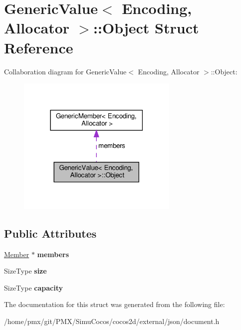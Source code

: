 \hypertarget{structGenericValue_1_1Object}{}\section{Generic\+Value$<$ Encoding, Allocator $>$\+:\+:Object Struct Reference}
\label{structGenericValue_1_1Object}


Collaboration diagram for Generic\+Value$<$ Encoding, Allocator $>$\+:\+:Object\+:
\nopagebreak
\begin{figure}[H]
\begin{center}
\leavevmode
\includegraphics[width=218pt]{structGenericValue_1_1Object__coll__graph}
\end{center}
\end{figure}
\subsection*{Public Attributes}
\begin{DoxyCompactItemize}
\item 
\mbox{\label{structGenericValue_1_1Object_ab51b8366577cb12f0280e4a6d7dab926}} 
\hyperlink{classGenericValue_a7ccf27c44058b4c11c3efc6473afb886}{Member} $\ast$ {\bfseries members}
\item 
\mbox{\label{structGenericValue_1_1Object_a10da3d9035961100ed11f955a4afd2b6}} 
Size\+Type {\bfseries size}
\item 
\mbox{\label{structGenericValue_1_1Object_ab22a81c7ac57baf0d4ea343dfd6d8b33}} 
Size\+Type {\bfseries capacity}
\end{DoxyCompactItemize}


The documentation for this struct was generated from the following file\+:\begin{DoxyCompactItemize}
\item 
/home/pmx/git/\+P\+M\+X/\+Simu\+Cocos/cocos2d/external/json/document.\+h\end{DoxyCompactItemize}

